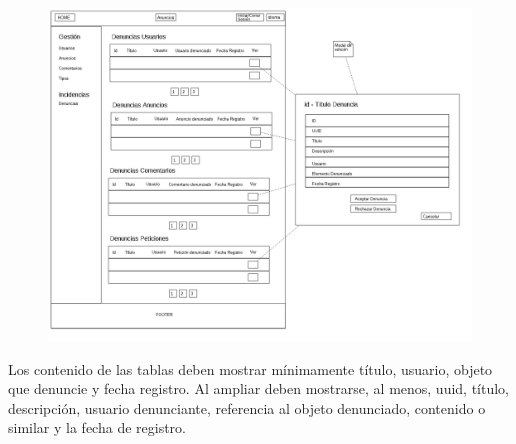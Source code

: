 \begin{figure}[h!]
\centering
\includegraphics[width=1\textwidth]{Img/VisionAplicacion/vision_13.jpg}
\end{figure}

Los contenido de las tablas deben mostrar m\'{i}nimamente t\'{i}tulo, usuario, objeto que denuncie y fecha registro. Al ampliar deben mostrarse, al menos, uuid, t\'{i}tulo, descripci\'{o}n, usuario denunciante, referencia al objeto denunciado, contenido o similar y la fecha de registro. 
